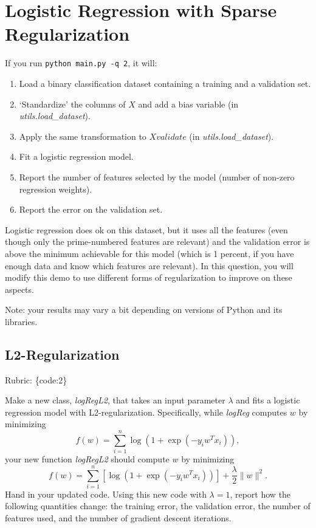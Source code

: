 \documentclass{article}
\def\rubric#1{\gre{Rubric: \{#1\}}}{}
\def\gre#1{{\color{gre}#1}}
\def\norm#1{\|#1\|}
\def\enum#1{\begin{enumerate}#1\end{enumerate}}
\begin{document}
\section{Logistic Regression with Sparse Regularization}

If you run  \verb|python main.py -q 2|, it will:
\enum{
\item Load a binary classification dataset containing a training and a validation set.
\item `Standardize' the columns of $X$ and add a bias variable (in \emph{utils.load\_dataset}).
\item Apply the same transformation to $Xvalidate$ (in \emph{utils.load\_dataset}).
\item Fit a logistic regression model.
\item Report the number of features selected by the model (number of non-zero regression weights).
\item Report the error on the validation set.
}
Logistic regression does ok on this dataset,
but it uses all the features (even though only the prime-numbered features are relevant)
and the validation error is above the minimum achievable for this model
(which is 1 percent, if you have enough data and know which features are relevant).
In this question, you will modify this demo to use different forms of regularization
 to improve on these aspects.

Note: your results may vary a bit depending on versions of Python and its libraries.


\subsection{L2-Regularization}
\rubric{code:2}

Make a new class, \emph{logRegL2}, that takes an input parameter $\lambda$ and fits a logistic regression model with L2-regularization. Specifically, while \emph{logReg} computes $w$ by minimizing
\[
f(w) = \sum_{i=1}^n \log(1+\exp(-y_iw^Tx_i)),
\]
your new function \emph{logRegL2} should compute $w$ by minimizing
\[
f(w) = \sum_{i=1}^n \left[\log(1+\exp(-y_iw^Tx_i))\right] + \frac{\lambda}{2}\norm{w}^2.
\]
Hand in your updated code. Using this new code with $\lambda = 1$, report how the following quantities change: the training error, the validation error, the number of features used, and the number of gradient descent iterations.
\end{document}
